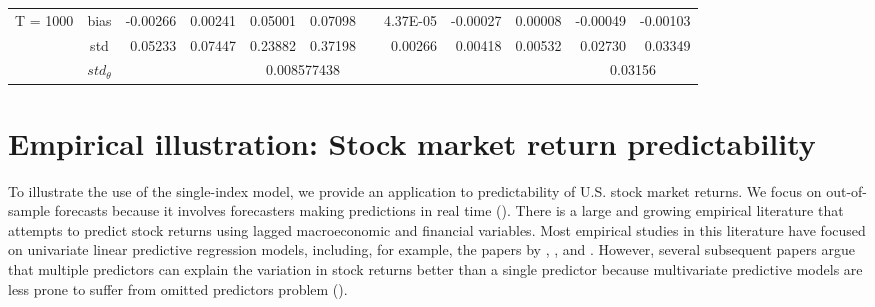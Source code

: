 \documentclass[a4paper,12pt,times,numbered,print,index]{report}
\numberwithin{equation}{section}
\begin{document}
\begin{table}[htbp]
\begin{adjustbox}{max width=1.1\textwidth}
\begin{tabular}{cc|rrccrrrrcc}
				\multirow{3}[1]{*}{T = 1000} & bias  & -0.00266 & 0.00241 & \multicolumn{1}{r}{0.05001} & \multicolumn{1}{r}{0.07098} &       & 4.37E-05 & -0.00027 & 0.00008 & \multicolumn{1}{r}{-0.00049} & \multicolumn{1}{r}{-0.00103} \\
				& std   & 0.05233 & 0.07447 & \multicolumn{1}{r}{0.23882} & \multicolumn{1}{r}{0.37198} &       & 0.00266 & 0.00418 & 0.00532 & \multicolumn{1}{r}{0.02730} & \multicolumn{1}{r}{0.03349} \\
				& $std_{\theta}$ &       &       & \multicolumn{2}{c}{0.008577438} &       &       &       &       & \multicolumn{2}{c}{0.03156} \\
				\bottomrule
				\bottomrule
			\end{tabular}%
		\end{adjustbox}
		\label{cointegrated}%
	\end{table}%
	
	\section{Empirical illustration: Stock market return predictability}
	
	
	
	To illustrate the use of the single-index model, we provide an application to predictability of U.S. stock market returns. We focus on out-of-sample forecasts because it involves forecasters making predictions in real time (\cite{stock2007has}). There is a large and growing empirical literature that attempts to predict stock returns using lagged macroeconomic and financial
	variables. Most empirical studies in this literature have focused on univariate linear predictive regression models, including, for example, the papers by  \cite{campbell1987stock}, \cite{fama1989business}, \cite{pesaran1995predictability} and \cite{choi2016reexamination}. However, several subsequent papers argue that multiple predictors can explain the variation in stock returns better than a single predictor because multivariate predictive models are less prone to suffer from omitted predictors problem (\cite{cochrane2011presidential}). 
	
	
\end{document}
